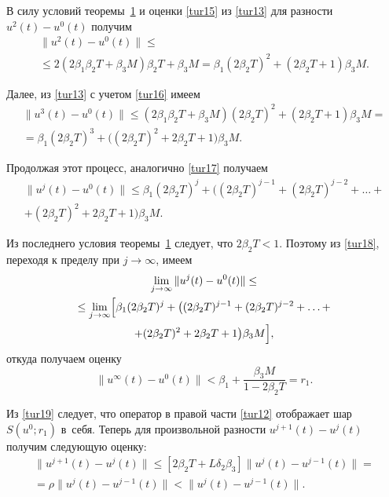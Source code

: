 В силу условий теоремы~\hyperlink{yuld:th1}{1} и оценки \eqref{tur15} из \eqref{tur13} для разности $u^{ 2} (t)-u^{ 0} (t)$ получим
\begin{multline}
\| u^{ 2} (t)-u^{ 0} (t) \| \le
\\
\le 2  (2  \beta_1  \beta_2  T+\beta_3  M)  \beta_2  T+\beta_3  M= 
\beta_1 (2  \beta_2  T)^2+(2  \beta_2  T+1)  \beta_3  M .
\label{tur16}
\end{multline}

Далее, из \eqref{tur13} с учетом \eqref{tur16} имеем
\begin{multline}
\| u^{ 3} (t)-u^{ 0} (t) \| \le (2  \beta_1  \beta_2  T+\beta_3  M )  ( 2  \beta_2  T)^2+(2  \beta_2  T+1)  \beta_3  M=
\\
=\beta_1  (2  \beta_2  T)^3+\big( (2  \beta_2  T)^2+ 2  \beta_2  T+1 \big)  \beta_3  M .
\label{tur17}
\end{multline}

Продолжая этот процесс, аналогично \eqref{tur17} получаем
\begin{multline}
\| u^{ j} (t)-u^{ 0} (t) \| \le \beta_1  (2  \beta_2  T)^j
+\bigl( (2  \beta_2  T)^{j-1}+(2  \beta_2  T)^{j-2}+ \ldots + \\ +(2 \beta_2  T)^2+2  \beta_2  T+1 \bigr)  \beta_3  M.
\label{tur18}
\end{multline}

Из последнего условия теоремы~\hyperlink{yuld:th1}{1} следует, что $2 \beta_2  T<1$. 
Поэтому из \eqref{tur18}, переходя к пределу при $j \to \infty$, имеем
\begin{multline*}
\lim_{j \to \infty} \| u^{ j} (t)-u^{ 0} (t) \| \le  \\
\le
\lim_{j \to \infty} \Bigl[ \beta_1 ( 2  \beta_2  T)^j
+\bigl( (2  \beta_2  T)^{j-1}+(2  \beta_2  T)^{j-2}+ \ldots +\\
 +(2  \beta_2  T)^2+2  \beta_2  T+1 \bigr)  
\beta_3  M \Bigr],
\end{multline*}
откуда получаем оценку
\begin{equation}
\label{tur19}
\| u^{ \infty} (t)-u^{ 0} (t) \|<\beta_1+\frac{\beta_3  M}{1-2  \beta_2  T}=r_1 .
\end{equation}

Из \eqref{tur19} следует, что оператор в правой части \eqref{tur12} отображает шар $S ( u^{ 0} ; r_1 )$ в~себя.
Теперь для произвольной разности $u^{ j+1} (t)-u^{ j} (t)$ получим следующую оценку:
\begin{multline}
\| u^{ j+1} (t)-u^{ j} (t) \|
\le \left[2  \beta_{ 2}  T+L \delta_{ 2}  \beta_{ 3}  \right]  
\| u^{ j} (t)-u^{ j-1} (t) \|= 
\\
 =\rho  \| u^{ j} (t)-u^{ j-1} (t) \|< \| u^{ j} (t)-u^{ j-1} (t) \| .
 \label{tur20}
\end{multline}

